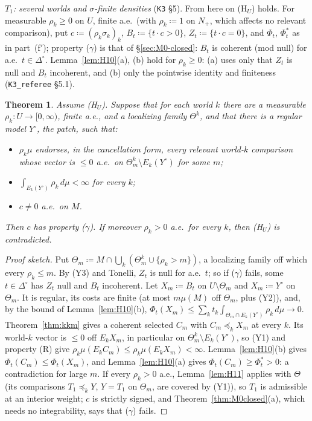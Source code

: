 \documentclass[11pt]{article}
\newtheorem{theorem}{Theorem}[section]
\theoremstyle{definition}
\theoremstyle{remark}
\newcommand{\Di}{\Delta^{\circ}}
\newcommand{\src}[1]{\texttt{#1}}
\begin{document}
\emph{$T_1$: several worlds and $\sigma$-finite densities} (\src{K3} \S5). From here on (H$_U$) holds. For measurable $\rho_k\ge0$ on $U$, finite a.e.\ (with $\rho_k\coloneqq1$ on $N_+$, which affects no relevant comparison), put $c\coloneqq(\rho_k\sigma_k)_k$, $B_t\coloneqq\{t\cdot c>0\}$, $Z_t\coloneqq\{t\cdot c=0\}$, and $\Phi_t$, $\Phi^*_t$ as in part~(f$'$); property ($\gamma$) is that of \S\ref{sec:M0-closed}: $B_t$ is coherent (mod null) for a.e.\ $t\in\Di$. Lemma~\ref{lem:H10}(a), (b) hold for $\rho_k\ge0$: (a) uses only that $Z_t$ is null and $B_t$ incoherent, and (b) only the pointwise identity and finiteness (\src{K3\_referee} \S5.1).

\begin{theorem}\label{thm:K35}
Assume (H$_U$). Suppose that for each world $k$ there are a measurable $\rho_k:U\to[0,\infty)$, finite a.e., and a localizing family $\Theta^k$, and that there is a regular model $Y^\circ$, the \emph{patch}, such that:
\begin{itemize}[leftmargin=*]
\item[\textbf{(Y1)}] $\rho_k\mu$ endorses, in the cancellation form, every relevant world-$k$ comparison whose vector is $\le0$ a.e.\ on $\Theta^k_m\setminus E_k(Y^\circ)$ for some $m$;
\item[\textbf{(Y2)}] $\int_{E_k(Y^\circ)}\rho_k\,d\mu<\infty$ for every $k$;
\item[\textbf{(Y3)}] $c\ne0$ a.e.\ on $M$.
\end{itemize}
Then $c$ has property ($\gamma$). If moreover $\rho_k>0$ a.e.\ for every $k$, then (H$_U$) is contradicted.
\end{theorem}
\begin{proof}[Proof sketch]
Put $\Theta_m\coloneqq M\cap\bigcup_k(\Theta^k_m\cup\{\rho_k>m\})$, a localizing family off which every $\rho_k\le m$. By (Y3) and Tonelli, $Z_t$ is null for a.e.\ $t$; so if ($\gamma$) fails, some $t\in\Di$ has $Z_t$ null and $B_t$ incoherent. Let $X_m\coloneqq B_t$ on $U\setminus\Theta_m$ and $X_m\coloneqq Y^\circ$ on $\Theta_m$. It is regular, its costs are finite (at most $m\mu(M)$ off $\Theta_m$, plus (Y2)), and, by the bound of Lemma~\ref{lem:H10}(b), $\Phi_t(X_m)\le\sum_kt_k\int_{\Theta_m\cap E_k(Y^\circ)}\rho_k\,d\mu\to0$. Theorem~\ref{thm:kkm} gives a coherent selected $C_m$ with $C_m\preceq_kX_m$ at every $k$. Its world-$k$ vector is $\le0$ off $E_kX_m$, in particular on $\Theta^k_m\setminus E_k(Y^\circ)$, so (Y1) and property (R) give $\rho_k\mu(E_kC_m)\le\rho_k\mu(E_kX_m)<\infty$. Lemma~\ref{lem:H10}(b) gives $\Phi_t(C_m)\le\Phi_t(X_m)$, and Lemma~\ref{lem:H10}(a) gives $\Phi_t(C_m)\ge\Phi^*_t>0$: a contradiction for large $m$. If every $\rho_k>0$ a.e., Lemma~\ref{lem:H11} applies with $\Theta$ (its comparisons $T_1\preceq_kY$, $Y=T_1$ on $\Theta_m$, are covered by (Y1)), so $T_1$ is admissible at an interior weight; $c$ is strictly signed, and Theorem~\ref{thm:M0closed}(a), which needs no integrability, says that ($\gamma$) fails.
\end{proof}
\end{document}
